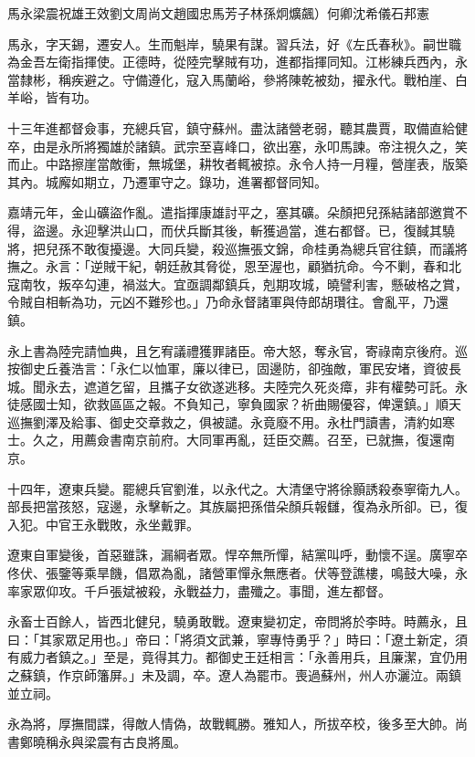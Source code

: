 
\begin{pinyinscope}
馬永梁震祝雄王效劉文周尚文趙國忠馬芳子林孫炯爌飆）何卿沈希儀石邦憲

馬永，字天錫，遷安人。生而魁岸，驍果有謀。習兵法，好《左氏春秋》。嗣世職為金吾左衛指揮使。正德時，從陸完擊賊有功，進都指揮同知。江彬練兵西內，永當隸彬，稱疾避之。守備遵化，寇入馬蘭峪，參將陳乾被劾，擢永代。戰柏崖、白羊峪，皆有功。

十三年進都督僉事，充總兵官，鎮守蘇州。盡汰諸營老弱，聽其農賈，取備直給健卒，由是永所將獨雄於諸鎮。武宗至喜峰口，欲出塞，永叩馬諫。帝注視久之，笑而止。中路擦崖當敵衝，無城堡，耕牧者輒被掠。永令人持一月糧，營崖表，版築其內。城廨如期立，乃遷軍守之。錄功，進署都督同知。

嘉靖元年，金山礦盜作亂。遣指揮康雄討平之，塞其礦。朵顏把兒孫結諸部邀賞不得，盜邊。永迎擊洪山口，而伏兵斷其後，斬獲過當，進右都督。已，復馘其驍將，把兒孫不敢復擾邊。大同兵變，殺巡撫張文錦，命桂勇為總兵官往鎮，而議將撫之。永言：「逆賊干紀，朝廷赦其脅從，恩至渥也，顧猶抗命。今不剿，春和北寇南牧，叛卒勾連，禍滋大。宜亟調鄰鎮兵，剋期攻城，曉譬利害，懸破格之賞，令賊自相斬為功，元凶不難殄也。」乃命永督諸軍與侍郎胡瓚往。會亂平，乃還鎮。

永上書為陸完請恤典，且乞宥議禮獲罪諸臣。帝大怒，奪永官，寄祿南京後府。巡按御史丘養浩言：「永仁以恤軍，廉以律已，固邊防，卻強敵，軍民安堵，資彼長城。聞永去，遮道乞留，且攜子女欲遂逃移。夫陸完久死炎瘴，非有權勢可託。永徒感國士知，欲救區區之報。不負知己，寧負國家？祈曲賜優容，俾還鎮。」順天巡撫劉澤及給事、御史交章救之，俱被譴。永竟廢不用。永杜門讀書，清約如寒士。久之，用薦僉書南京前府。大同軍再亂，廷臣交薦。召至，已就撫，復還南京。

十四年，遼東兵變。罷總兵官劉淮，以永代之。大清堡守將徐顥誘殺泰寧衛九人。部長把當孩怒，寇邊，永擊斬之。其族屬把孫借朵顏兵報讎，復為永所卻。已，復入犯。中官王永戰敗，永坐戴罪。

遼東自軍變後，首惡雖誅，漏綱者眾。悍卒無所憚，結黨叫呼，動懷不逞。廣寧卒佟伏、張鑒等乘旱饑，倡眾為亂，諸營軍憚永無應者。伏等登譙樓，鳴鼓大噪，永率家眾仰攻。千戶張斌被殺，永戰益力，盡殲之。事聞，進左都督。

永畜士百餘人，皆西北健兒，驍勇敢戰。遼東變初定，帝問將於李時。時薦永，且曰：「其家眾足用也。」帝曰：「將須文武兼，寧專恃勇乎？」時曰：「遼土新定，須有威力者鎮之。」至是，竟得其力。都御史王廷相言：「永善用兵，且廉潔，宜仍用之蘇鎮，作京師籓屏。」未及調，卒。遼人為罷市。喪過蘇州，州人亦灑泣。兩鎮並立祠。

永為將，厚撫間諜，得敵人情偽，故戰輒勝。雅知人，所拔卒校，後多至大帥。尚書鄭曉稱永與梁震有古良將風。


\end{pinyinscope}
